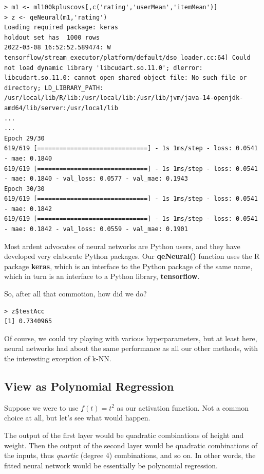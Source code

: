 \begin{lstlisting}
> m1 <- ml100kpluscovs[,c('rating','userMean','itemMean')]
> z <- qeNeural(m1,'rating')
Loading required package: keras
holdout set has  1000 rows
2022-03-08 16:52:52.589474: W tensorflow/stream_executor/platform/default/dso_loader.cc:64] Could not load dynamic library 'libcudart.so.11.0'; dlerror: libcudart.so.11.0: cannot open shared object file: No such file or directory; LD_LIBRARY_PATH: /usr/local/lib/R/lib:/usr/local/lib:/usr/lib/jvm/java-14-openjdk-amd64/lib/server:/usr/local/lib
...
...
Epoch 29/30
619/619 [==============================] - 1s 1ms/step - loss: 0.0541 - mae: 0.1840
619/619 [==============================] - 1s 1ms/step - loss: 0.0541 - mae: 0.1840 - val_loss: 0.0577 - val_mae: 0.1943
Epoch 30/30
619/619 [==============================] - 1s 1ms/step - loss: 0.0541 - mae: 0.1842
619/619 [==============================] - 1s 1ms/step - loss: 0.0541 - mae: 0.1842 - val_loss: 0.0559 - val_mae: 0.1901
\end{lstlisting}

Most ardent advocates of neural networks are Python users, and they have
developed very elaborate Python packages.  Our \textbf{qeNeural()}
function uses the R package \textbf{keras}, which is an interface to the
Python package of the same name, which in turn is an interface to a
Python library, \textbf{tensorflow}.

So, after all that commotion, how did we do?

\begin{lstlisting}
> z$testAcc
[1] 0.7340965
\end{lstlisting}

Of course, we could try playing with various hyperparameters, but at
least here, neural networks had about the same performance as all our
other methods, with the interesting exception of k-NN.

\subsection{View as Polynomial Regression}

Suppose we were to use $f(t) = t^2$ as our activation function.
Not a common choice at all, but let's see what would happen.

The output of the first layer would be quadratic combinations of height
and weight.  Then the output of the second layer would be quadratic
combinations of the inputs, thus \textit{quartic} (degree 4)
combinations, and so on.  In other words, the fitted neural network
would be essentially be polynomial regression.

